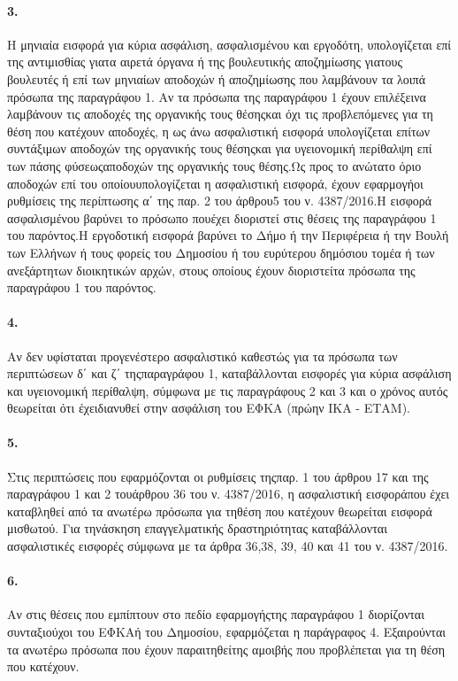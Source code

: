 \documentclass[a4paper,oneside, 10pt]{book}
\begin{document}
\paragraph { 3. } Η μηνιαία εισφορά για κύρια ασφάλιση, ασφαλισμένου και εργοδότη, υπολογίζεται επί της αντιμισθίας γιατα αιρετά όργανα ή της βουλευτικής αποζημίωσης γιατους βουλευτές ή επί των μηνιαίων αποδοχών ή αποζημίωσης που λαμβάνουν τα λοιπά πρόσωπα της παραγράφου 1. Αν τα πρόσωπα της παραγράφου 1 έχουν επιλέξεινα λαμβάνουν τις αποδοχές της οργανικής τους θέσηςκαι όχι τις προβλεπόμενες για τη θέση που κατέχουν αποδοχές, η ως άνω ασφαλιστική εισφορά υπολογίζεται επίτων συντάξιμων αποδοχών της οργανικής τους θέσηςκαι για υγειονομική περίθαλψη επί των πάσης φύσεωςαποδοχών της οργανικής τους θέσης.Ως προς το ανώτατο όριο αποδοχών επί του οποίουυπολογίζεται η ασφαλιστική εισφορά, έχουν εφαρμογήοι ρυθμίσεις της περίπτωσης α΄ της παρ. 2 του άρθρου5 του ν. 4387/2016.Η εισφορά ασφαλισμένου βαρύνει το πρόσωπο πουέχει διοριστεί στις θέσεις της παραγράφου 1 του παρόντος.Η εργοδοτική εισφορά βαρύνει το Δήμο ή την Περιφέρεια ή την Βουλή των Ελλήνων ή τους φορείς του Δημοσίου ή του ευρύτερου δημόσιου τομέα ή των ανεξάρτητων διοικητικών αρχών, στους οποίους έχουν διοριστείτα πρόσωπα της παραγράφου 1 του παρόντος.
\paragraph { 4. } Αν δεν υφίσταται προγενέστερο ασφαλιστικό καθεστώς για τα πρόσωπα των περιπτώσεων δ΄ και ζ΄ τηςπαραγράφου 1, καταβάλλονται εισφορές για κύρια ασφάλιση και υγειονομική περίθαλψη, σύμφωνα με τις παραγράφους 2 και 3 και ο χρόνος αυτός θεωρείται ότι έχειδιανυθεί στην ασφάλιση του ΕΦΚΑ (πρώην ΙΚΑ - ΕΤΑΜ).
\paragraph { 5. } Στις περιπτώσεις που εφαρμόζονται οι ρυθμίσεις τηςπαρ. 1 του άρθρου 17 και της παραγράφου 1 και 2 τουάρθρου 36 του ν. 4387/2016, η ασφαλιστική εισφοράπου έχει καταβληθεί από τα ανωτέρω πρόσωπα για τηθέση που κατέχουν θεωρείται εισφορά μισθωτού. Για τηνάσκηση επαγγελματικής δραστηριότητας καταβάλλονται ασφαλιστικές εισφορές σύμφωνα με τα άρθρα 36,38, 39, 40 και 41 του ν. 4387/2016.
\paragraph { 6. } Αν στις θέσεις που εμπίπτουν στο πεδίο εφαρμογήςτης παραγράφου 1 διορίζονται συνταξιούχοι του ΕΦΚΑή του Δημοσίου, εφαρμόζεται η παράγραφος 4. Εξαιρούνται τα ανωτέρω πρόσωπα που έχουν παραιτηθείτης αμοιβής που προβλέπεται για τη θέση που κατέχουν.
\end{document}
